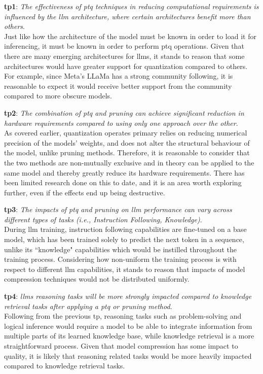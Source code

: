 \documentclass{ifacconf}
\begin{document}
	\textbf{\gls{tp}1}: \textit{The effectiveness of \gls{ptq} techniques in reducing computational requirements is influenced by the \gls{llm} architecture, where certain architectures benefit more than others}.\\
	Just like how the architecture of the model must be known in order to load it for inferencing, it must be known in order to perform \gls{ptq} operations. Given that there are many emerging architectures for \glspl{llm}, it stands to reason that some architectures would have greater support for quantization compared to others. For example, since Meta's LLaMa has a strong community following, it is reasonable to expect it would receive better support from the community compared to more obscure models.
	
	
	\textbf{\gls{tp}2}: \textit{The combination of \gls{ptq} and pruning can achieve significant reduction in hardware requirements compared to using only one approach over the other}.\\
	As covered earlier, quantization operates primary relies on reducing numerical precision of the models' weights, and does not alter the structural behaviour of the model, unlike pruning methods. Therefore, it is reasonable to consider that the two methods are non-mutually exclusive and in theory can be applied to the same model and thereby greatly reduce its hardware requirements. There has been limited research done on this to date, and it is an area worth exploring further, even if the effects end up being destructive.
	
	\textbf{\gls{tp}3}: \textit{The impacts of \gls{ptq} and pruning on \gls{llm} performance can vary across different types of tasks (i.e., Instruction Following, Knowledge)}.\\
	During \gls{llm} training, instruction following capabilities are fine-tuned on a base model, which has been trained solely to predict the next token in a sequence, unlike its ``knowledge" capabilities which would be instilled throughout the training process. Considering how non-uniform the training process is with respect to different \gls{llm} capabilities, it stands to reason that impacts of model compression techniques would not be distributed uniformly.
	
	
	\textbf{\gls{tp}4}: \textit{\glspl{llm} reasoning tasks will be more strongly impacted compared to knowledge retrieval tasks after applying a \gls{ptq} or pruning method}.\\
	Following from the previous \gls{tp}, reasoning tasks such as problem-solving and logical inference would require a model to be able to integrate information from multiple parts of its learned knowledge base, while knowledge retrieval is a more straightforward process. Given that model compression has some impact to quality, it is likely that reasoning related tasks would be more heavily impacted compared to knowledge retrieval tasks.
	
\end{document}
